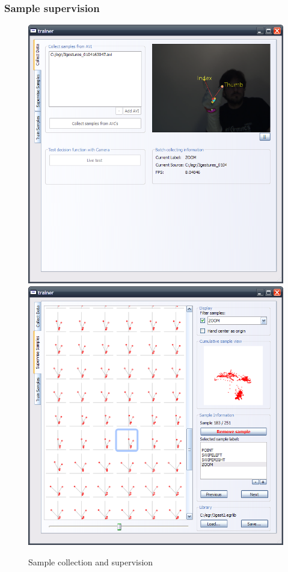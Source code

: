 \documentclass{beamer}
\begin{document}
	\begin{frame}
		\frametitle{Sample supervision}
		\begin{figure}
			\hspace*{-2cm}
			\includegraphics[height=0.65\textheight]{images/collect-samples} \hspace*{0.5cm}
			\includegraphics[height=0.65\textheight]{images/sample-supervision} 
			\caption{Sample collection and supervision}
		\end{figure}
	\end{frame}
\end{document}
